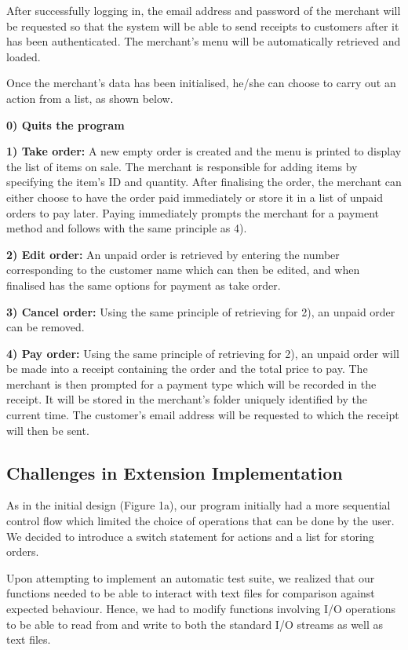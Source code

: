 \documentclass[11pt]{article}
\begin{document}
After successfully logging in, the email address and password of the merchant will be requested so that the system will be able to send receipts to customers after it has been authenticated. The merchant’s menu will be automatically retrieved and loaded. 

Once the merchant’s data has been initialised, he/she can choose to carry out an action from a list, as shown below.

\textbf{0) Quits the program}

\textbf{1) Take order:}  
A new empty order is created and the menu is printed to display the list of items on sale. The merchant is responsible for adding items by specifying the item’s ID and quantity. After finalising the order, the merchant can either choose to have the order paid immediately or store it in a list of unpaid orders to pay later. Paying immediately prompts the merchant for a payment method and follows with the same principle as 4).

\textbf{2) Edit order:} 
An unpaid order is retrieved by entering the number corresponding to the customer name which can then be edited, and when finalised has the same options for payment as take order. 

\textbf{3) Cancel order:}
Using the same principle of retrieving for 2), an unpaid order can be removed. 

\textbf{4) Pay order: }
Using the same principle of retrieving for 2), an unpaid order will be made into a receipt containing the order and the total price to pay. The merchant is then prompted for a payment type which will be recorded in the receipt. It will be stored in the merchant’s folder uniquely identified by the current time. The customer’s email address will be requested to which the receipt will then be sent.
\subsection{Challenges in Extension Implementation}
As in the initial design (Figure 1a), our program initially had a more sequential control flow which limited the choice of operations that can be done by the user. We decided to introduce a switch statement for actions and a list for storing orders.

Upon attempting to implement an automatic test suite, we realized that our functions needed to be able to interact with text files for comparison against expected behaviour. Hence, we had to modify functions involving I/O operations to be able to read from and write to both the standard I/O streams as well as text files.
\end{document}
